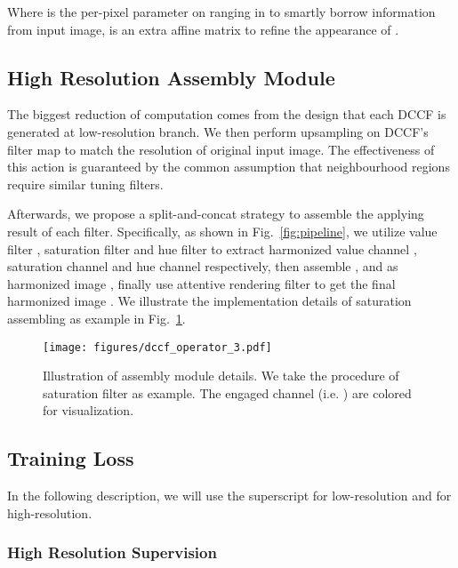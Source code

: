 \documentclass[runningheads]{llncs}
\begin{document}
    
    Where  is the per-pixel parameter on  ranging in  to smartly borrow information from input image,  is an extra affine matrix to refine the appearance of .
    
    




    
    \subsection{High Resolution Assembly Module} \label{subsection:assembly}
    
    The biggest reduction of computation comes from the design that each DCCF is generated at low-resolution branch.
    We then perform upsampling on DCCF's filter map to match the resolution of original input image.
    The effectiveness of this action is guaranteed by the common assumption that neighbourhood regions require similar tuning filters. 
    
    Afterwards, we propose a split-and-concat strategy to assemble the applying result of each filter. 
    Specifically, as shown in Fig.~\ref{fig:pipeline}, we utilize value filter , saturation filter  and hue filter  to extract harmonized value channel , saturation channel  and hue channel  respectively, then assemble ,  and  as harmonized image , finally use attentive rendering filter to get the final harmonized image .
    We illustrate the implementation details of saturation assembling as example in Fig.~\ref{fig:pipeline_add}.
    
\begin{figure}[t]
        \centering
        \texttt{[image: figures/dccf\_operator\_3.pdf]}
        \caption{
        Illustration of assembly module details. We take the procedure of saturation filter  as example. The engaged channel (i.e. ) are colored for visualization.
        }
        \vspace{-15pt}
    \label{fig:pipeline_add}
    \end{figure}
    
    \subsection{Training Loss} \label{subsection:loss}


In the following description, we will use the superscript  for low-resolution and  for high-resolution.
    


    \subsubsection{High Resolution Supervision}
    
\end{document}
